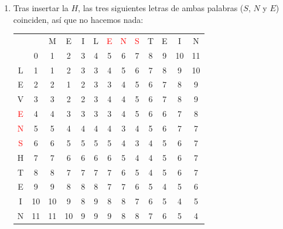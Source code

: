 \documentclass[10pt,a4paper,spanish]{report}
\theoremstyle{definition}
\theoremstyle{remark}
\begin{document}
\begin{enumerate}
\item Tras insertar la $H$, las tres siguientes letras de ambas palabras ($S$, $N$ y $E$) coinciden, así que no hacemos nada:
\begin{center}
\begin{tabular}{c|c|c|c|c|c|c|c|c|c|c|c|c|}
\multicolumn{2}{r}{} & \multicolumn{1}{c}{M} & \multicolumn{1}{c}{E} & \multicolumn{1}{c}{I} & \multicolumn{1}{c}{L} & \multicolumn{1}{c}{\textcolor{Red}{E}} & \multicolumn{1}{c}{\textcolor{Red}{N}} & \multicolumn{1}{c}{\textcolor{Red}{S}} & \multicolumn{1}{c}{T} & \multicolumn{1}{c}{E} & \multicolumn{1}{c}{I} & \multicolumn{1}{c}{N} \\ 
\cline{2-13} 
& 0 & 1 & 2 & 3 & 4 & 5 & 6 & 7 & 8 & 9 & 10 & 11 \\
\cline{2-13}
L & 1 & 1 & 2 & 3 & 3 & 4 & 5 & 6 & 7 & 8 & 9 & 10 \\
\cline{2-13} 
E & 2 & 2 & 1 & 2 & 3 & 3 & 4 & 5 & 6 & 7 & 8 & 9 \\
\cline{2-13} 
V & 3 & 3 & 2 & 2 & 3 & 4 & 4 & 5 & 6 & 7 & 8 & 9 \\
\cline{2-13} 
\textcolor{Red}{E} & 4 & 4 & 3 & 3 & 3 & \cellcolor{Green}3 & 4 & 5 & 6 & 6 & 7 & 8 \\
\cline{2-13} 
\textcolor{Red}{N} & 5 & 5 & 4 & 4 & 4 & 4 & \cellcolor{Green}3 & 4 & 5 & 6 & 7 & 7 \\
\cline{2-13} 
\textcolor{Red}{S} & 6 & 6 & 5 & 5 & 5 & 5 & 4 & \cellcolor{Green}3 & 4 & 5 & 6 & 7 \\
\cline{2-13} 
H & 7 & 7 & 6 & 6 & 6 & 6 & 5 & \cellcolor{Green}4 & 4 & 5 & 6 & 7 \\
\cline{2-13} 
T & 8 & 8 & 7 & 7 & 7 & 7 & 6 & 5 & \cellcolor{Green}4 & 5 & 6 & 7 \\
\cline{2-13}
E & 9 & 9 & 8 & 8 & 8 & 7 & 7 & 6 & 5 & \cellcolor{Green}4 & 5 & 6 \\
\cline{2-13} 
I & 10 & 10 & 9 & 8 & 9 & 8 & 8 & 7 & 6 & 5 & \cellcolor{Green}4 & 5 \\
\cline{2-13} 
N & 11 & 11 & 10 & 9 & 9 & 9 & 8 & 8 & 7 & 6 & 5 & \cellcolor{Green}4 \\
\cline{2-13} 
\end{tabular}
\end{center}


\end{enumerate}
\end{document}
